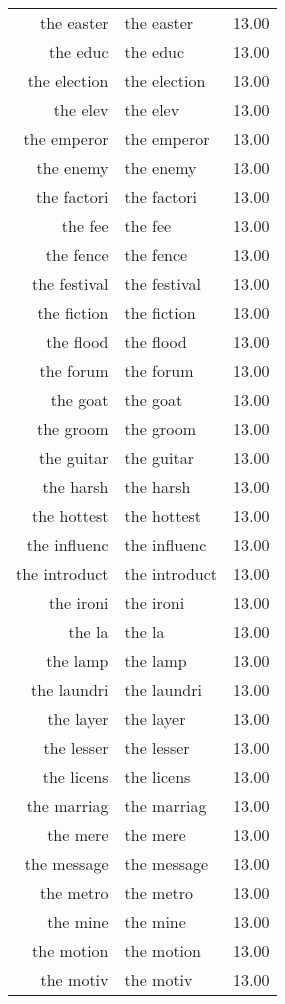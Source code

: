 \begin{table}[ht]
\begin{tabular}{rlr}
  the easter & the easter & 13.00 \\ 
  the educ & the educ & 13.00 \\ 
  the election & the election & 13.00 \\ 
  the elev & the elev & 13.00 \\ 
  the emperor & the emperor & 13.00 \\ 
  the enemy & the enemy & 13.00 \\ 
  the factori & the factori & 13.00 \\ 
  the fee & the fee & 13.00 \\ 
  the fence & the fence & 13.00 \\ 
  the festival & the festival & 13.00 \\ 
  the fiction & the fiction & 13.00 \\ 
  the flood & the flood & 13.00 \\ 
  the forum & the forum & 13.00 \\ 
  the goat & the goat & 13.00 \\ 
  the groom & the groom & 13.00 \\ 
  the guitar & the guitar & 13.00 \\ 
  the harsh & the harsh & 13.00 \\ 
  the hottest & the hottest & 13.00 \\ 
  the influenc & the influenc & 13.00 \\ 
  the introduct & the introduct & 13.00 \\ 
  the ironi & the ironi & 13.00 \\ 
  the la & the la & 13.00 \\ 
  the lamp & the lamp & 13.00 \\ 
  the laundri & the laundri & 13.00 \\ 
  the layer & the layer & 13.00 \\ 
  the lesser & the lesser & 13.00 \\ 
  the licens & the licens & 13.00 \\ 
  the marriag & the marriag & 13.00 \\ 
  the mere & the mere & 13.00 \\ 
  the message & the message & 13.00 \\ 
  the metro & the metro & 13.00 \\ 
  the mine & the mine & 13.00 \\ 
  the motion & the motion & 13.00 \\ 
  the motiv & the motiv & 13.00 \\ 

\end{tabular}
\end{table}
